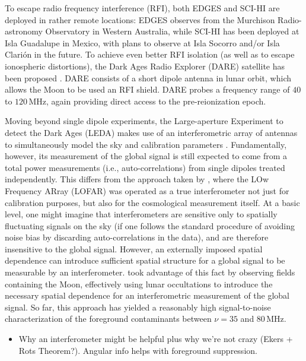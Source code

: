 \documentclass[twolcolumn,apj]{emulateapj}
\begin{document}
To escape radio frequency interference (RFI), both EDGES and SCI-HI are deployed in rather remote locations: EDGES observes from the Murchison Radio-astronomy Observatory in Western Australia, while SCI-HI has been deployed at Isla Guadalupe in Mexico, with plans to observe at Isla Socorro and/or Isla Clari\'{o}n in the future.  To achieve even better RFI isolation (as well as to escape ionospheric distortions), the Dark Ages Radio Explorer (DARE) satellite has been proposed \citep{DAREMCMC}.  DARE consists of a short dipole antenna in lunar orbit, which allows the Moon to be used an RFI shield.  DARE probes a frequency range of $40$ to $120\,\textrm{MHz}$, again providing direct access to the pre-reionization epoch.

Moving beyond single dipole experiments, the Large-aperture Experiment to detect the Dark Ages (LEDA) makes use of an interferometric array of antennas to simultaneously model the sky and calibration parameters \citep{BernardiLEDA}.  Fundamentally, however, its measurement of the global signal is still expected to come from a total power measurements (i.e., auto-correlations) from single dipoles treated independently.  This differs from the approach taken by \citet{VedanthamLOFAR2}, where the LOw Frequency ARray (LOFAR) was operated as a true interferometer not just for calibration purposes, but also for the cosmological measurement itself.  At a basic level, one might imagine that interferometers are sensitive only to spatially fluctuating signals on the sky (if one follows the standard procedure of avoiding noise bias by discarding auto-correlations in the data), and are therefore insensitive to the global signal.  However, an externally imposed spatial dependence can introduce sufficient spatial structure for a global signal to be measurable by an interferometer.  \citet{VedanthamLOFAR2} took advantage of this fact by observing fields containing the Moon, effectively using lunar occultations to introduce the necessary spatial dependence for an interferometric measurement of the global signal.  So far, this approach has yielded a reasonably high signal-to-noise characterization of the foreground contaminants between $\nu =35$ and $80\,\textrm{MHz}$.

\begin{itemize}
\item Why an interferometer might be helpful plus why we're not crazy (Ekers + Rots Theorem?).  Angular info helps with foreground suppression.
\end{itemize}
\end{document}
